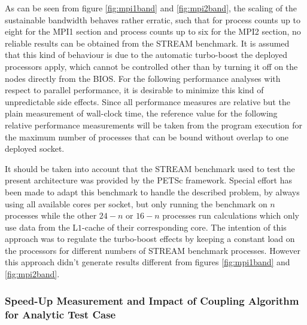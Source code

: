 As can be seen from figure \ref{fig:mpi1band} and \ref{fig:mpi2band}, the scaling of the sustainable bandwidth behaves rather erratic, such that for process counts up to eight for the MPI1 section and process counts up to six for the MPI2 section, no reliable results can be obtained from the STREAM benchmark. It is assumed that this kind of behaviour is due to the automatic turbo-boost the deployed processors apply, which cannot be controlled other than by turning it off on the nodes directly from the BIOS. For the following performance analyses with respect to parallel performance, it is desirable to minimize this kind of unpredictable side effects. Since all performance measures are relative but the plain measurement of wall-clock time, the reference value for the following relative performance measurements will be taken from the program execution for the maximum number of processes that can be bound without overlap to one deployed socket.

It should be taken into account that the STREAM benchmark used to test the present architecture was provided by the PETSc framework. Special effort has been made to adapt this benchmark to handle the described problem, by always using all available cores per socket, but only running the benchmark on \(n\) processes while the other \(24 - n\) or \(16 - n\) processes run calculations which only use data from the L\(1\)-cache of their corresponding core. The intention of this approach was to regulate the turbo-boost effects by keeping a constant load on the processors for different numbers of STREAM benchmark processes. However this approach didn't generate results different from figures \ref{fig:mpi1band} and \ref{fig:mpi2band}.

\subsubsection{Speed-Up Measurement and Impact of Coupling Algorithm for Analytic Test Case}
\label{sec:speedup}

